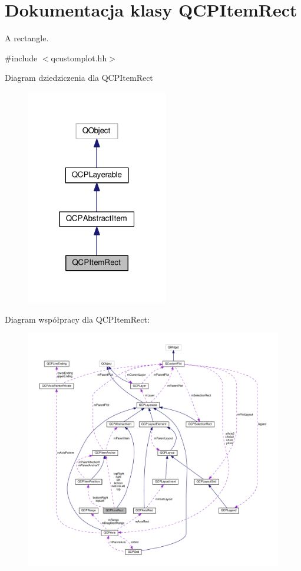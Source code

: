 \hypertarget{class_q_c_p_item_rect}{}\section{Dokumentacja klasy Q\+C\+P\+Item\+Rect}
\label{class_q_c_p_item_rect}


A rectangle.  




{\ttfamily \#include $<$qcustomplot.\+hh$>$}



Diagram dziedziczenia dla Q\+C\+P\+Item\+Rect\nopagebreak
\begin{figure}[H]
\begin{center}
\leavevmode
\includegraphics[width=175pt]{class_q_c_p_item_rect__inherit__graph}
\end{center}
\end{figure}


Diagram współpracy dla Q\+C\+P\+Item\+Rect\+:\nopagebreak
\begin{figure}[H]
\begin{center}
\leavevmode
\includegraphics[width=350pt]{class_q_c_p_item_rect__coll__graph}
\end{center}
\end{figure}
